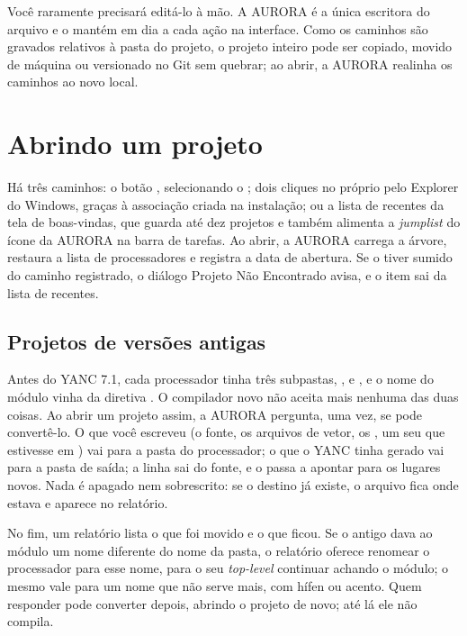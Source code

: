 Você raramente precisará editá-lo à mão. A AURORA é a única escritora do arquivo e o mantém em dia a cada ação na interface. Como os caminhos são gravados relativos à pasta do projeto, o projeto inteiro pode ser copiado, movido de máquina ou versionado no Git sem quebrar; ao abrir, a AURORA realinha os caminhos ao novo local.

\section{Abrindo um projeto}

Há três caminhos: o botão , selecionando o ; dois cliques no próprio  pelo Explorer do Windows, graças à associação criada na instalação; ou a lista de recentes da tela de boas-vindas, que guarda até dez projetos e também alimenta a \textit{jumplist} do ícone da AURORA na barra de tarefas. Ao abrir, a AURORA carrega a árvore, restaura a lista de processadores e registra a data de abertura. Se o  tiver sumido do caminho registrado, o diálogo Projeto Não Encontrado avisa, e o item sai da lista de recentes.

\subsection*{Projetos de versões antigas}

Antes do YANC 7.1, cada processador tinha três subpastas, ,  e , e o nome do módulo vinha da diretiva . O compilador novo não aceita mais nenhuma das duas coisas. Ao abrir um projeto assim, a AURORA pergunta, uma vez, se pode convertê-lo. O que você escreveu (o fonte, os arquivos de vetor, os , um  seu que estivesse em ) vai para a pasta do processador; o que o YANC tinha gerado vai para a pasta de saída; a linha  sai do fonte, e o  passa a apontar para os lugares novos. Nada é apagado nem sobrescrito: se o destino já existe, o arquivo fica onde estava e aparece no relatório.

No fim, um relatório lista o que foi movido e o que ficou. Se o  antigo dava ao módulo um nome diferente do nome da pasta, o relatório oferece renomear o processador para esse nome, para o seu \textit{top-level} continuar achando o módulo; o mesmo vale para um nome que não serve mais, com hífen ou acento. Quem responder  pode converter depois, abrindo o projeto de novo; até lá ele não compila.

